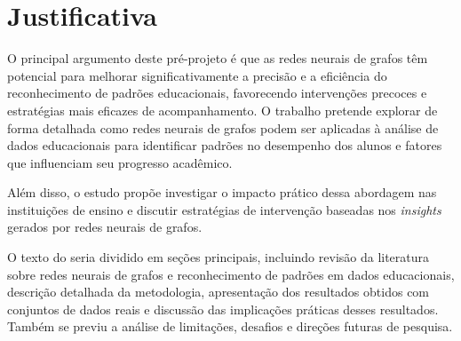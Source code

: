 \chapter{Justificativa}
\label{pre:justificativa}

O principal argumento deste pr\'e-projeto \'e que as redes neurais de grafos t\^em potencial para melhorar significativamente a precis\~ao e a efici\^encia do reconhecimento de padr\~oes educacionais, favorecendo interven\c{c}\~oes precoces e estrat\'egias mais eficazes de acompanhamento. O trabalho pretende explorar de forma detalhada como redes neurais de grafos podem ser aplicadas \`a an\'alise de dados educacionais para identificar padr\~oes no desempenho dos alunos e fatores que influenciam seu progresso acad\^emico.

Al\'em disso, o estudo prop\~oe investigar o impacto pr\'atico dessa abordagem nas institui\c{c}\~oes de ensino e discutir estrat\'egias de interven\c{c}\~ao baseadas nos \textit{insights} gerados por redes neurais de grafos.

O texto do  seria dividido em se\c{c}\~oes principais, incluindo revis\~ao da literatura sobre redes neurais de grafos e reconhecimento de padr\~oes em dados educacionais, descri\c{c}\~ao detalhada da metodologia, apresenta\c{c}\~ao dos resultados obtidos com conjuntos de dados reais e discuss\~ao das implica\c{c}\~oes pr\'aticas desses resultados. Tamb\'em se previu a an\'alise de limita\c{c}\~oes, desafios e dire\c{c}\~oes futuras de pesquisa.
